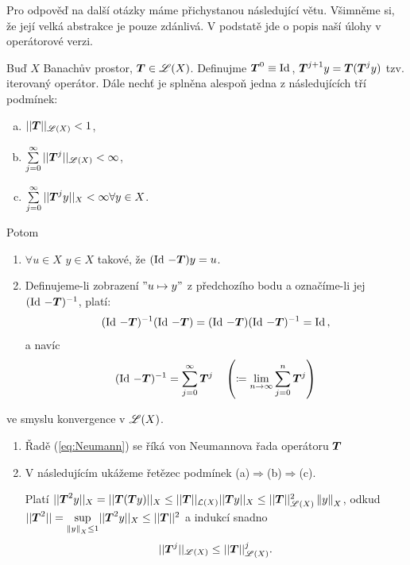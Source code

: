Pro odpověď na další otázky máme přichystanou následující větu. Všimněme si, že její velká abstrakce je pouze zdánlivá. V podstatě jde o popis naší úlohy v operátorové verzi.


\begin{theorem}
\label{theorem:str14}
Buď $X$ Banachův prostor, $ \boldsymbol{T} \in\mathscr{L}(X)$. Definujme $ \boldsymbol{T} ^0\equiv \operatorname{Id}\,$, $ \boldsymbol{T} ^{j+1}y= \boldsymbol{T} ( \boldsymbol{T} ^jy)$ tzv. iterovaný operátor. Dále nechť je splněna alespoň jedna z následujících tří podmínek:
\begin{enumerate}[(a)]
    \item $|| \boldsymbol{T} ||_{\mathscr{L}(X)}<1$,
    \item $\sum\limits_{j=0}^\infty|| \boldsymbol{T} ^j||_{\mathscr{L}(X)}<\infty$,
    \item $\sum\limits_{j=0}^\infty|| \boldsymbol{T} ^jy||_X<\infty \forall y\in X$.
\end{enumerate}
Potom
\begin{enumerate}
    \item $\forall u \in X$  $y\in X$ takové, že $(\operatorname{Id}\,- \boldsymbol{T} )y=u$.
    \item Definujeme-li zobrazení $"u\mapsto y"$ z předchozího bodu a označíme-li jej $(\operatorname{Id}\,- \boldsymbol{T} )^{-1}$, platí:
    \begin{equation}
        (\operatorname{Id}\,- \boldsymbol{T} )^{-1}(\operatorname{Id}\,- \boldsymbol{T} ) = (\operatorname{Id}\,- \boldsymbol{T} )(\operatorname{Id}\,- \boldsymbol{T} )^{-1}=\operatorname{Id}\,,
    \end{equation}
    a navíc
    \begin{equation}
        (\operatorname{Id}\,- \boldsymbol{T} )^{-1}=\sum\limits_{j=0}^\infty  \boldsymbol{T} ^j \quad \left(\coloneqq \underset{n\rightarrow\infty}{\lim} \sum\limits_{j=0}^{n}  \boldsymbol{T} ^j\right)
        \label{eq:Neumann}
    \end{equation}
\end{enumerate}
ve smyslu konvergence v $\mathscr{L}(X)$.
\end{theorem} 

\Poznamka

\begin{enumerate}
    \item Řadě (\ref{eq:Neumann}) se říká von Neumannova řada operátoru $ \boldsymbol{T} $
    \item V následujícím ukážeme řetězec podmínek (a)$\Rightarrow$(b)$\Rightarrow$(c).
    
    Platí $|| \boldsymbol{T} ^2y||_X = || \boldsymbol{T} ( \boldsymbol{T} y)||_X\leq|| \boldsymbol{T} ||_{\mathcal{L}(X)}|| \boldsymbol{T} y||_X\leq|| \boldsymbol{T} ||^2_{\mathscr{L}(X)}\left\lVert y\right\rVert_X$, odkud $|| \boldsymbol{T} ^2||=\underset{\left\lVert y\right\rVert_X\leq 1}{\sup}|| \boldsymbol{T} ^2y||_X\leq|| \boldsymbol{T} ||^2$ a indukcí snadno
    \begin{equation}
        || \boldsymbol{T} ^j||_{\mathscr{L}(X)}\leq || \boldsymbol{T} ||^j_{\mathscr{L}(X)}.
    \end{equation}
\end{enumerate}

